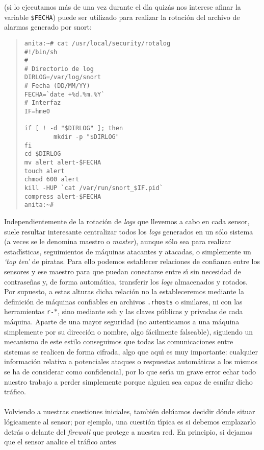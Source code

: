(si lo ejecutamos m\'as de una vez durante el d\'{\i}a quiz\'as nos interese
afinar la variable {\tt \$FECHA}) puede ser utilizado para realizar la 
rotaci\'on del archivo de alarmas generado por {\sc snort}:
\begin{quote}
\begin{verbatim}
anita:~# cat /usr/local/security/rotalog
#!/bin/sh
#
# Directorio de log
DIRLOG=/var/log/snort
# Fecha (DD/MM/YY)
FECHA=`date +%d.%m.%Y`
# Interfaz
IF=hme0

if [ ! -d "$DIRLOG" ]; then
        mkdir -p "$DIRLOG"
fi
cd $DIRLOG
mv alert alert-$FECHA
touch alert
chmod 600 alert
kill -HUP `cat /var/run/snort_$IF.pid`
compress alert-$FECHA
anita:~# 
\end{verbatim}
\end{quote}
Independientemente de la rotaci\'on de {\it logs} que llevemos a cabo en
cada sensor, suele resultar interesante centralizar todos los {\it logs} 
generados en un s\'olo sistema (a veces se le denomina maestro o {\it master}),
aunque s\'olo sea para realizar estad\'{\i}sticas, seguimientos de m\'aquinas
atacantes y atacadas, o simplemente un {\it `top ten'} de piratas. Para ello
podemos establecer relaciones de confianza entre los sensores y ese maestro
para que puedan conectarse entre s\'{\i} sin necesidad de contrase\~nas y,
de forma autom\'atica, transferir los {\it logs} almacenados y rotados. Por
supuesto, a estas alturas dicha relaci\'on no la estableceremos mediante la 
definici\'on de m\'aquinas confiables en archivos {\tt .rhosts} o similares, ni
con las herramientas {\tt r-$\ast$}, sino mediante {\sc ssh} y las claves 
p\'ublicas y privadas de cada m\'aquina. Aparte de una mayor seguridad (no
autenticamos a una m\'aquina simplemente por su direcci\'on o nombre, algo
f\'acilmente falseable), siguiendo un mecanismo de este estilo conseguimos que
todas las comunicaciones entre sistemas se realicen de forma cifrada, algo que
aqu\'{\i} es muy importante: cualquier informaci\'on relativa a potenciales
ataques o respuestas autom\'aticas a los mismos se ha de considerar como 
confidencial, por lo que ser\'{\i}a un grave error echar todo nuestro trabajo
a perder simplemente porque alguien sea capaz de esnifar dicho tr\'afico.\\
\\Volviendo a nuestras cuestiones iniciales, tambi\'en deb\'{\i}amos decidir 
d\'onde situar l\'ogicamente al sensor; por ejemplo, una cuesti\'on t\'{\i}pica
es si debemos emplazarlo detr\'as o delante del {\it firewall} que protege a
nuestra red. En principio, si dejamos que el sensor analice el tr\'afico antes
